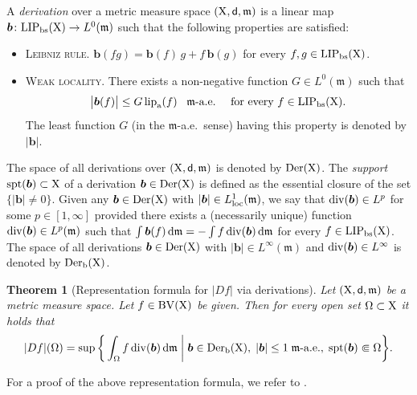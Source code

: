 \documentclass[reqno]{amsart}
\numberwithin{equation}{section}
\newcommand{\X}{{\rm X}}
\newcommand{\sfd}{{\sf d}}
\newcommand{\mm}{\mathfrak m}
\renewcommand{\d}{{\mathrm d}}
\newcommand{\1}{\mathbbm 1}
\newcommand{\LIP}{{\rm LIP}}
\newcommand{\lip}{{\rm lip}}
\newcommand{\loc}{{\rm loc}}
\newcommand{\BV}{{\rm BV}}
\newtheorem{theorem}{Theorem}[section]
\begin{document}
A \emph{derivation} over a metric measure space \((\X,\sfd,\mm)\) is a
linear map \(\boldsymbol b\colon\LIP_{\rm bs}(\X)\to L^0(\mm)\) such that
the following properties are satisfied:
\begin{itemize}
\item[\(\rm i)\)] \textsc{Leibniz rule.}
\(\boldsymbol b(fg)=\boldsymbol b(f)\,g+f\,\boldsymbol b(g)\)
for every \(f,g\in\LIP_{\rm bs}(\X)\).
\item[\(\rm ii)\)] \textsc{Weak locality.} There exists a non-negative
function \(G\in L^0(\mm)\) such that
\[
\big|\boldsymbol b(f)\big|\leq G\,\lip_{\rm a}(f)\;\;\;\mm\text{-a.e.}
\quad\text{ for every }f\in\LIP_{\rm bs}(\X).
\]
The least function \(G\) (in the \(\mm\)-a.e.\ sense) having this property
is denoted by \(|\boldsymbol b|\).
\end{itemize}
The space of all derivations over \((\X,\sfd,\mm)\) is denoted by \({\rm Der}(\X)\).
The \emph{support} \({\rm spt}(\boldsymbol b)\subset\X\) of a derivation
\(\boldsymbol b\in{\rm Der}(\X)\) is defined as the essential closure of
the set \(\big\{|\boldsymbol b|\neq 0\big\}\). Given any \(\boldsymbol b\in{\rm Der}(\X)\)
with \(|\boldsymbol b|\in L^1_\loc(\mm)\), we say that \({\rm div}(\boldsymbol b)\in L^p\)
for some \(p\in[1,\infty]\) provided there exists a (necessarily unique)
function \({\rm div}(\boldsymbol b)\in L^p(\mm)\) such that
\(\int\boldsymbol b(f)\,\d\mm=-\int f\,{\rm div}(\boldsymbol b)\,\d\mm\)
for every \(f\in\LIP_{\rm bs}(\X)\). The space of all derivations
\(\boldsymbol b\in{\rm Der}(\X)\) with \(|\boldsymbol b|\in L^\infty(\mm)\)
and \({\rm div}(\boldsymbol b)\in L^\infty\) is denoted by \({\rm Der}_{\rm b}(\X)\).
%
% 
\begin{theorem}[Representation formula for \(|Df|\) via derivations]
\label{thm:repr_Df_deriv}
Let \((\X,\sfd,\mm)\) be a metric measure space. Let \(f\in\BV(\X)\) be given.
Then for every open set \(\Omega\subset\X\) it holds that
\[
|Df|(\Omega)=\sup\bigg\{\int_\Omega f\,{\rm div}(\boldsymbol b)\,\d\mm
\;\bigg|\;\boldsymbol b\in{\rm Der}_{\rm b}(\X),\;|\boldsymbol b|\leq 1\;
\mm\text{-{}\rm a.e.},\;{\rm spt}(\boldsymbol b)\Subset\Omega\bigg\}.
\]
\end{theorem}
%
%
For a proof of the above representation formula,
we refer to \cite[Theorem 7.3.4]{DiMarinoPhD}.
%
%
%
%
\end{document}

